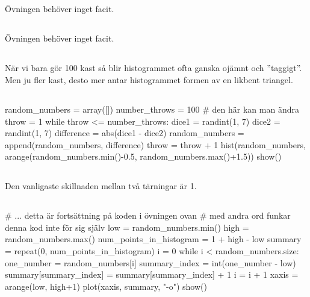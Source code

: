 \subsection*{}
Övningen behöver inget facit.
\newpage
\subsection*{}
Övningen behöver inget facit.

\subsection*{}
När vi bara gör 100 kast så blir histogrammet ofta ganska ojämnt och ''taggigt''. Men ju fler kast, desto mer antar histogrammet formen av en likbent triangel.

\subsection*{}
\vspace{3pt}
\begin{python}
random_numbers = array([])
number_throws = 100 # den här kan man ändra
throw = 1
while throw <= number_throws:
	dice1 = randint(1, 7)
	dice2 = randint(1, 7)
	difference = abs(dice1 - dice2)
	random_numbers = append(random_numbers, difference)
	throw = throw + 1
hist(random_numbers, arange(random_numbers.min()-0.5, random_numbers.max()+1.5))
show()
\end{python}

\subsection*{}
Den vanligaste skillnaden mellan två tärningar är 1.

\subsection*{}
\vspace{3pt}
\begin{python}
# ... detta är fortsättning på koden i övningen ovan
# med andra ord funkar denna kod inte för sig själv
low = random_numbers.min()
high = random_numbers.max()
num_points_in_histogram = 1 + high - low
summary = repeat(0, num_points_in_histogram)
i = 0
while i < random_numbers.size:
	one_number = random_numbers[i]
	summary_index = int(one_number - low)
	summary[summary_index] = summary[summary_index] + 1
	i = i + 1
xaxis = arange(low, high+1)
plot(xaxis, summary, "-o")
show()
\end{python}

